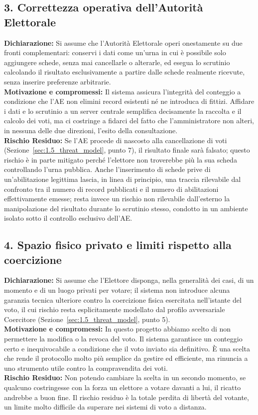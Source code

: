 \subsection*{3. Correttezza operativa dell'Autorità Elettorale}
\textbf{Dichiarazione:} Si assume che l'Autorità Elettorale operi onestamente su due fronti complementari: conservi i dati come un'urna in cui è possibile solo aggiungere schede, senza mai cancellarle o alterarle, ed esegua lo scrutinio calcolando il risultato esclusivamente a partire dalle schede realmente ricevute, senza inserire preferenze arbitrarie. \\
\textbf{Motivazione e compromessi:} Il sistema assicura l'integrità del conteggio a condizione che l'AE non elimini record esistenti né ne introduca di fittizi. Affidare i dati e lo scrutinio a un server centrale semplifica decisamente la raccolta e il calcolo dei voti, ma ci costringe a fidarci del fatto che l'amministratore non alteri, in nessuna delle due direzioni, l'esito della consultazione. \\
\textbf{Rischio Residuo:} Se l'AE procede di nascosto alla cancellazione di voti (Sezione~\ref{sec:1.5_threat_model}, punto 7), il risultato finale sarà falsato; questo rischio è in parte mitigato perché l'elettore non troverebbe più la sua scheda controllando l'urna pubblica. Anche l'inserimento di schede prive di un'abilitazione legittima lascia, in linea di principio, una traccia rilevabile dal confronto tra il numero di record pubblicati e il numero di abilitazioni effettivamente emesse; resta invece un rischio non rilevabile dall'esterno la manipolazione del risultato durante lo scrutinio stesso, condotto in un ambiente isolato sotto il controllo esclusivo dell'AE.

\subsection*{4. Spazio fisico privato e limiti rispetto alla coercizione}
\textbf{Dichiarazione:} Si assume che l'Elettore disponga, nella generalità dei casi, di un momento e di un luogo privati per votare; il sistema non introduce alcuna garanzia tecnica ulteriore contro la coercizione fisica esercitata nell'istante del voto, il cui rischio resta esplicitamente modellato dal profilo avversariale Coercitore (Sezione~\ref{sec:1.5_threat_model}, punto 5). \\
\textbf{Motivazione e compromessi:} In questo progetto abbiamo scelto di non permettere la modifica o la revoca del voto. Il sistema garantisce un conteggio certo e inequivocabile a condizione che il voto inviato sia definitivo. È una scelta che rende il protocollo molto più semplice da gestire ed efficiente, ma rinuncia a uno strumento utile contro la compravendita dei voti. \\
\textbf{Rischio Residuo:} Non potendo cambiare la scelta in un secondo momento, se qualcuno costringesse con la forza un elettore a votare davanti a lui, il ricatto andrebbe a buon fine. Il rischio residuo è la totale perdita di libertà del votante, un limite molto difficile da superare nei sistemi di voto a distanza.

